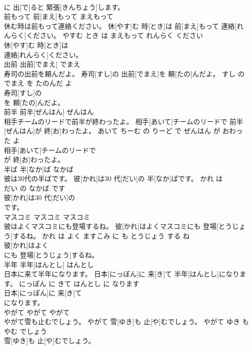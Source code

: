 \documentclass[8pt]{extreport}
\begin{document}
\begin{CJK}{UTF8}{min}
\\	に 出[で]ると 緊張[きんちょう]します。			
\\	前もって	前[まえ]もって	まえもって	
\\	休む時は前もって連絡ください。	休[やす]む 時[とき]は 前[まえ]もって 連絡[れんらく]ください。	やすむ とき は まえもって れんらく ください	
\\	休[やす]む 時[とき]は
\\	連絡[れんらく]ください。			
\\	出前	出前[でまえ]	でまえ	
\\	寿司の出前を頼んだよ。	寿司[すし]の 出前[でまえ]を 頼[たの]んだよ。	すし の でまえ を たのんだ よ	
\\	寿司[すし]の
\\	を 頼[たの]んだよ。			
\\	前半	前半[ぜんはん]	ぜんはん	
\\	相手チームのリードで前半が終わったよ。	相手[あいて]チームのリードで 前半[ぜんはん]が 終[お]わったよ。	あいて ちーむ の りーど で ぜんはん が おわった よ	
\\	相手[あいて]チームのリードで
\\	が 終[お]わったよ。			
\\	半ば	半[なか]ば	なかば	
\\	彼は30代の半ばです。	彼[かれ]は30 代[だい]の 半[なか]ばです。	かれ は 
\\	だい の なかば です	
\\	彼[かれ]は30 代[だい]の
\\	です。			
\\	マスコミ	マスコミ	マスコミ	
\\	彼はよくマスコミにも登場するね。	彼[かれ]はよくマスコミにも 登場[とうじょう]するね。	かれ は よく ますこみ に も とうじょう する ね	
\\	彼[かれ]はよく
\\	にも 登場[とうじょう]するね。			
\\	半年	半年[はんとし]	はんとし	
\\	日本に来て半年になります。	日本[にっぽん]に 来[き]て 半年[はんとし]になります。	にっぽん に きて はんとし に なります	
\\	日本[にっぽん]に 来[き]て
\\	になります。			
\\	やがて	やがて	やがて	
\\	やがて雪も止むでしょう。	やがて 雪[ゆき]も 止[や]むでしょう。	やがて ゆき も やむ でしょう	
\\	雪[ゆき]も 止[や]むでしょう。			

\end{CJK}
\end{document}
